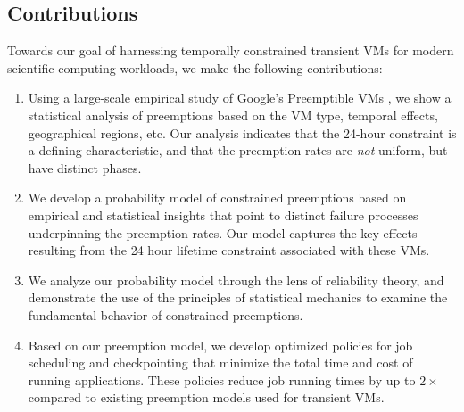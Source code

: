 \subsection{Contributions}

Towards our goal of harnessing temporally constrained transient VMs for modern scientific computing workloads, 
we make the following contributions:
\begin{enumerate} [leftmargin=12pt]
\item Using a large-scale empirical study of Google's Preemptible VMs \footnotemark, we show a statistical analysis of preemptions based on the VM type, temporal effects, geographical regions, etc. Our analysis indicates that the 24-hour constraint is a defining characteristic, and that the preemption rates are \emph{not} uniform, but have distinct phases. 

\item We develop a probability model of constrained preemptions based on empirical and statistical insights that point to distinct failure processes underpinning the preemption rates. Our model captures the key effects resulting from the 24 hour lifetime constraint associated with these VMs.

\item We analyze our probability model through the lens of reliability theory, and demonstrate the use of the principles of statistical mechanics to examine the fundamental behavior of constrained preemptions. 

  


\item Based on our preemption model, we develop optimized policies for job scheduling and checkpointing that minimize the total time and cost of running applications. These policies reduce job running times by up to $2\times$ compared to existing preemption models used for transient VMs. 
  


\end{enumerate}
